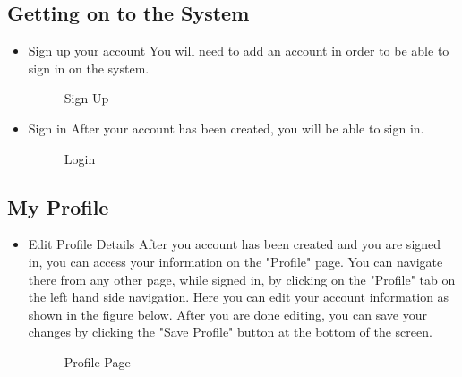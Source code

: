 \subsection{Getting on to the System}
\begin{itemize}
	\item{Sign up your account}
	\newline
	You will need to add an account in order to be able to sign in on the system.
	\begin{figure}[H]
	    	\centering
	    	\caption{Sign Up}
	    	\label{fig:Learning rate 0.1}
   	\end{figure}
	\item{Sign in}
	\newline
	After your account has been created, you will be able to sign in.
	\begin{figure}[H]
	    	\centering
	    	\caption{Login}
	    	\label{fig:Learning rate 0.1}
   	\end{figure}
\end{itemize}
\subsection{My Profile}
\begin{itemize}
	\item{Edit Profile Details}
	\newline
	After you account has been created and you are signed in, you can access your information on the "Profile" page. You can navigate there from any other page, while signed in, by clicking on the "Profile" tab on the left hand side navigation. Here you can edit your account information as shown in the figure below. After you are done editing, you can save your changes by clicking the "Save Profile" button at the bottom of the screen.
	\begin{figure}[H]
	    	\centering
	    	\caption{Profile Page}
	    	\label{fig:Learning rate 0.1}
   	\end{figure}
\end{itemize}